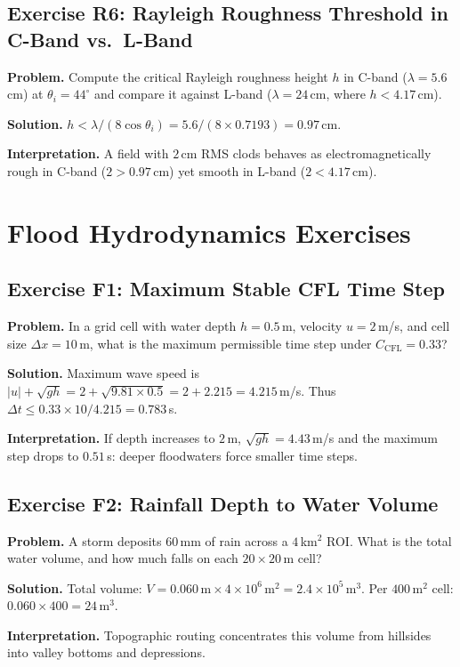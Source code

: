 \documentclass[11pt,a4paper]{article}
\begin{document}
\subsection*{Exercise R6: Rayleigh Roughness Threshold in C-Band vs.\ L-Band}
\textbf{Problem.} Compute the critical Rayleigh roughness height $h$ in C-band ($\lambda=5.6$\,cm) at $\theta_i=44^\circ$ and compare it against L-band ($\lambda=24$\,cm, where $h < 4.17$\,cm).

\textbf{Solution.} $h<\lambda/(8\cos\theta_i)=5.6/(8\times 0.7193)=0.97$\,cm.

\textbf{Interpretation.} A field with $2$\,cm RMS clods behaves as electromagnetically rough in C-band ($2 > 0.97$\,cm) yet smooth in L-band ($2 < 4.17$\,cm).

\section{Flood Hydrodynamics Exercises}
\label{sec:ej-flood}

\subsection*{Exercise F1: Maximum Stable CFL Time Step}
\textbf{Problem.} In a grid cell with water depth $h=0.5$\,m, velocity $u=2$\,m/s, and cell size $\Delta x=10$\,m, what is the maximum permissible time step under $C_{\mathrm{CFL}}=0.33$?

\textbf{Solution.} Maximum wave speed is $|u|+\sqrt{gh}=2+\sqrt{9.81\times0.5}=2+2.215=4.215$\,m/s. Thus $\Delta t\le 0.33\times10/4.215=0.783$\,s.

\textbf{Interpretation.} If depth increases to $2$\,m, $\sqrt{gh}=4.43$\,m/s and the maximum step drops to $0.51$\,s: deeper floodwaters force smaller time steps.

\subsection*{Exercise F2: Rainfall Depth to Water Volume}
\textbf{Problem.} A storm deposits $60$\,mm of rain across a $4$\,km$^2$ ROI. What is the total water volume, and how much falls on each $20\times20$\,m cell?

\textbf{Solution.} Total volume: $V=0.060\,\text{m}\times 4\times10^6\,\text{m}^2=2.4\times10^5$\,m$^3$. Per $400$\,m$^2$ cell: $0.060\times 400=24$\,m$^3$.

\textbf{Interpretation.} Topographic routing concentrates this volume from hillsides into valley bottoms and depressions.
\end{document}
